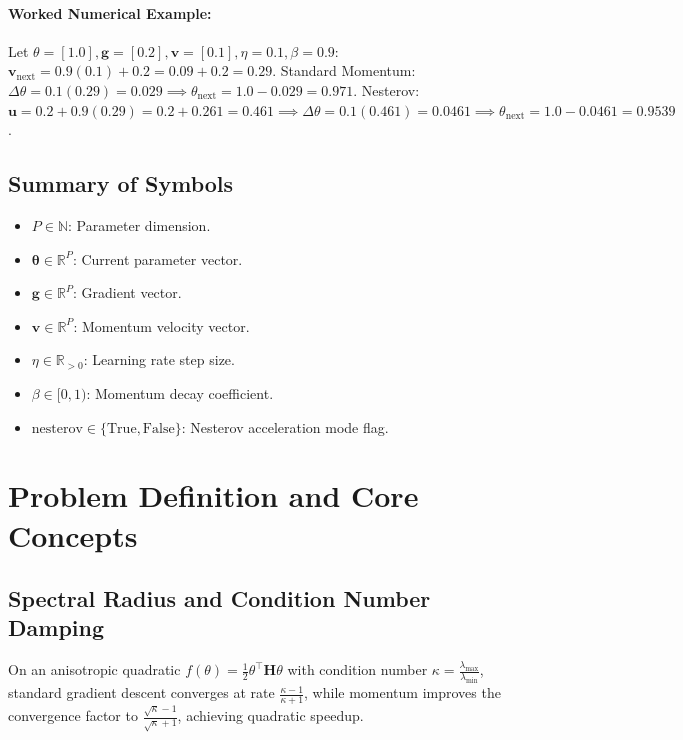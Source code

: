 \documentclass[11pt]{article}
\begin{document}
\paragraph{Worked Numerical Example:}
Let $\theta = [1.0], \mathbf{g} = [0.2], \mathbf{v} = [0.1], \eta = 0.1, \beta = 0.9$:
$\mathbf{v}_{\mathrm{next}} = 0.9(0.1) + 0.2 = 0.09 + 0.2 = 0.29$.
Standard Momentum: $\Delta\theta = 0.1(0.29) = 0.029 \implies \theta_{\mathrm{next}} = 1.0 - 0.029 = 0.971$.
Nesterov: $\mathbf{u} = 0.2 + 0.9(0.29) = 0.2 + 0.261 = 0.461 \implies \Delta\theta = 0.1(0.461) = 0.0461 \implies \theta_{\mathrm{next}} = 1.0 - 0.0461 = 0.9539$.

\subsection{Summary of Symbols}
\begin{itemize}
    \item $P \in \mathbb{N}$: Parameter dimension.
    \item $\boldsymbol{\theta} \in \mathbb{R}^P$: Current parameter vector.
    \item $\mathbf{g} \in \mathbb{R}^P$: Gradient vector.
    \item $\mathbf{v} \in \mathbb{R}^P$: Momentum velocity vector.
    \item $\eta \in \mathbb{R}_{>0}$: Learning rate step size.
    \item $\beta \in [0, 1)$: Momentum decay coefficient.
    \item $\mathrm{nesterov} \in \{\text{True}, \text{False}\}$: Nesterov acceleration mode flag.
\end{itemize}

\section{Problem Definition and Core Concepts}
\label{sec:problem_definition}

\subsection{Spectral Radius and Condition Number Damping}
On an anisotropic quadratic $f(\theta) = \frac{1}{2} \theta^\top \mathbf{H} \theta$ with condition number $\kappa = \frac{\lambda_{\max}}{\lambda_{\min}}$, standard gradient descent converges at rate $\frac{\kappa - 1}{\kappa + 1}$, while momentum improves the convergence factor to $\frac{\sqrt{\kappa} - 1}{\sqrt{\kappa} + 1}$, achieving quadratic speedup.
\end{document}
